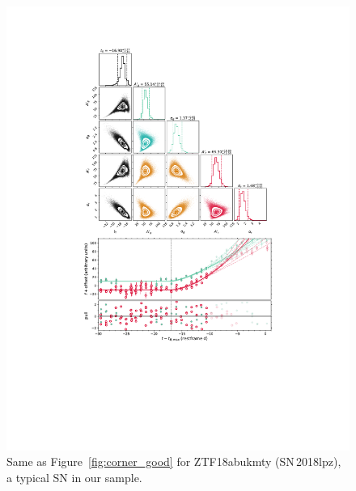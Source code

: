 \documentclass[twocolumn]{aastex63}
\begin{document}
\begin{figure}
    \centering
    \includegraphics[width=5.2in]{./figures/Fig2.pdf}
    \caption{Same as Figure~\ref{fig:corner_good} for ZTF18abukmty
    (SN\,2018lpz), a typical SN in our sample.}
    \label{fig:corner_median}
\end{figure}
\end{document}
